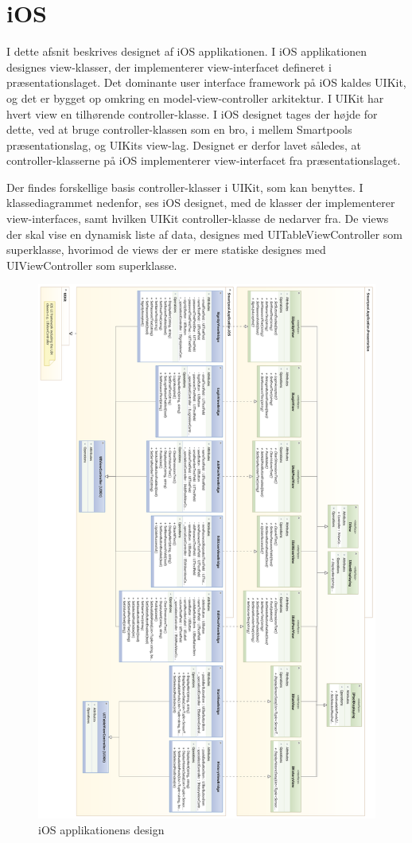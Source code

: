 \section{iOS}
I dette afsnit beskrives designet af iOS applikationen. I iOS applikationen designes view-klasser, der implementerer view-interfacet defineret i præsentationslaget. Det dominante user interface framework på iOS kaldes UIKit, og det er bygget op omkring en model-view-controller arkitektur. I UIKit har hvert view en tilhørende controller-klasse. I iOS designet tages der højde for dette, ved at bruge controller-klassen som en bro, i mellem Smartpools præsentationslag, og UIKits view-lag. Designet er derfor lavet således, at controller-klasserne på iOS implementerer view-interfacet fra præsentationslaget.

Der findes forskellige basis controller-klasser i UIKit, som kan benyttes. I klassediagrammet nedenfor, ses iOS designet, med de klasser der implementerer view-interfaces, samt hvilken UIKit controller-klasse de nedarver fra. De views der skal vise en dynamisk liste af data, designes med UITableViewController som superklasse, hvorimod de views der er mere statiske designes med UIViewController som superklasse. 

\begin{figure}
	\centering
	\includegraphics[width=0.9\linewidth]{figs/design/ios_full}
	\caption{iOS applikationens design}
	\label{fig:ios_full}
\end{figure}

